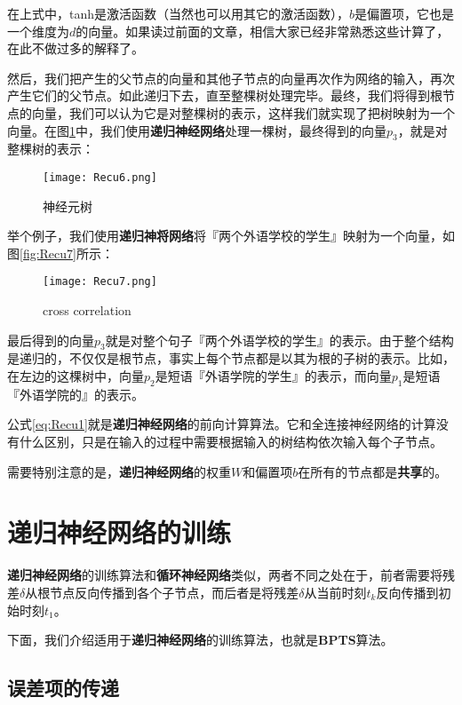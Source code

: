 在上式中，tanh是激活函数（当然也可以用其它的激活函数），\({b}\)是偏置项，它也是一个维度为\(d\)的向量。如果读过前面的文章，相信大家已经非常熟悉这些计算了，在此不做过多的解释了。

然后，我们把产生的父节点的向量和其他子节点的向量再次作为网络的输入，再次产生它们的父节点。如此递归下去，直至整棵树处理完毕。最终，我们将得到根节点的向量，我们可以认为它是对整棵树的表示，这样我们就实现了把树映射为一个向量。在图\ref{fig:Recu6}中，我们使用\textbf{递归神经网络}处理一棵树，最终得到的向量\({p}_3\)，就是对整棵树的表示：

\begin{figure}[!h]
	\centering
	\texttt{[image: Recu6.png]}
	\caption{神经元树}
	\label{fig:Recu6}
\end{figure}

举个例子，我们使用\textbf{递归神将网络}将『两个外语学校的学生』映射为一个向量，如图\ref{fig:Recu7}所示：

\begin{figure}[!h]
	\centering
	\texttt{[image: Recu7.png]}
	\caption{cross correlation}
	\label{神经元树映射}
\end{figure}

最后得到的向量\({p}_3\)就是对整个句子『两个外语学校的学生』的表示。由于整个结构是递归的，不仅仅是根节点，事实上每个节点都是以其为根的子树的表示。比如，在左边的这棵树中，向量\({p}_2\)是短语『外语学院的学生』的表示，而向量\({p}_1\)是短语『外语学院的』的表示。

公式\ref{eq:Recu1}就是\textbf{递归神经网络}的前向计算算法。它和全连接神经网络的计算没有什么区别，只是在输入的过程中需要根据输入的树结构依次输入每个子节点。

需要特别注意的是，\textbf{递归神经网络}的权重\(W\)和偏置项\({b}\)在所有的节点都是\textbf{共享}的。

\section{递归神经网络的训练}\label{Recu:3}

\textbf{递归神经网络}的训练算法和\textbf{循环神经网络}类似，两者不同之处在于，前者需要将残差\(\delta\)从根节点反向传播到各个子节点，而后者是将残差\(\delta\)从当前时刻\(t_k\)反向传播到初始时刻\(t_1\)。

下面，我们介绍适用于\textbf{递归神经网络}的训练算法，也就是\textbf{BPTS}算法。

\subsection{误差项的传递}\label{Recu:4}

